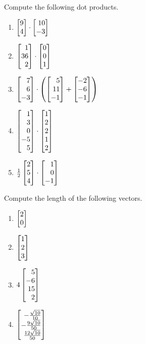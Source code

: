 \begin{exercises}
	\begin{problist}
		\prob  Compute the following dot products.
		\begin{enumerate}
			\item   $\mat{9\\4} \cdot \mat{10\\-3}$
			\item   $\mat{1\\36\\2} \cdot \mat{0\\0\\1}$
			\item   $\mat{7\\6\\-3} \cdot \left(\mat{5\\11\\-1} + \mat{-2\\-6\\-1}\right)$
			\item   $\mat{1\\3\\0\\-5\\5} \cdot \mat{1\\2\\2\\1\\2}$
			\item   $\frac{1}{2}\mat{2\\5\\4} \cdot \mat{1\\0\\-1}$
		\end{enumerate}
		\prob Compute the length of the following vectors.
		\begin{enumerate}
			\item $\mat{2\\0}$
			\item $\mat{1\\2\\3}$
			\item $4\mat{5\\-6\\15\\2}$
			\item $\mat{-\frac{\sqrt{10}}{10}\\-\frac{9\sqrt{10}}{50}\\\frac{12\sqrt{10}}{50}}$

\end{enumerate}
\end{problist}
\end{exercises}

